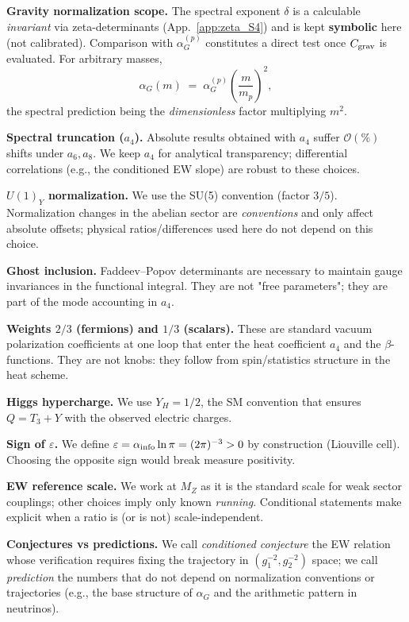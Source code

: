 \documentclass{article}
\numberwithin{equation}{section}
\theoremstyle{plain}
\theoremstyle{definition}
\theoremstyle{remark}
\begin{document}
\medskip
\noindent\textbf{Gravity normalization scope.}
The spectral exponent $\delta$ is a calculable \emph{invariant} via zeta-determinants (App.~\ref{app:zeta_S4}) and is kept \textbf{symbolic} here (not calibrated). Comparison with $\alpha_G^{(p)}$ constitutes a direct test once $C_{\rm grav}$ is evaluated. For arbitrary masses,
\begin{equation}
\label{eq:alphag-mass}
\alpha_G(m)\;=\;\alpha_G^{(p)}\left(\frac{m}{m_p}\right)^{\!2},
\end{equation}
the spectral prediction being the \emph{dimensionless} factor multiplying $m^2$.

\medskip
\noindent\textbf{Spectral truncation ($a_4$).}
Absolute results obtained with $a_4$ suffer $\mathcal{O}(\%)$ shifts under $a_6,a_8$. We keep $a_4$ for analytical transparency; differential correlations (e.g., the conditioned EW slope) are robust to these choices.

\medskip
\noindent\textbf{$U(1)_Y$ normalization.}
We use the SU(5) convention (factor $3/5$). Normalization changes in the abelian sector are \emph{conventions} and only affect absolute offsets; physical ratios/differences used here do not depend on this choice.

\medskip
\noindent\textbf{Ghost inclusion.}
Faddeev–Popov determinants are necessary to maintain gauge invariances in the functional integral. They are not "free parameters"; they are part of the mode accounting in $a_4$.

\medskip
\noindent\textbf{Weights $2/3$ (fermions) and $1/3$ (scalars).}
These are standard vacuum polarization coefficients at one loop that enter the heat coefficient $a_4$ and the $\beta$-functions. They are not knobs: they follow from spin/statistics structure in the heat scheme.

\medskip
\noindent\textbf{Higgs hypercharge.}
We use $Y_H=1/2$, the SM convention that ensures $Q=T_3+Y$ with the observed electric charges.

\medskip
\noindent\textbf{Sign of $\varepsilon$.}
We define $\varepsilon=\alpha_{\rm info}\ln\pi=(2\pi)^{-3}>0$ by construction (Liouville cell). Choosing the opposite sign would break measure positivity.

\medskip
\noindent\textbf{EW reference scale.}
We work at $M_Z$ as it is the standard scale for weak sector couplings; other choices imply only known \emph{running}. Conditional statements make explicit when a ratio is (or is not) scale-independent.

\medskip
\noindent\textbf{Conjectures vs predictions.}
We call \emph{conditioned conjecture} the EW relation whose verification requires fixing the trajectory in $(g_1^{-2},g_2^{-2})$ space; we call \emph{prediction} the numbers that do not depend on normalization conventions or trajectories (e.g., the base structure of $\alpha_G$ and the arithmetic pattern in neutrinos).
\end{document}
